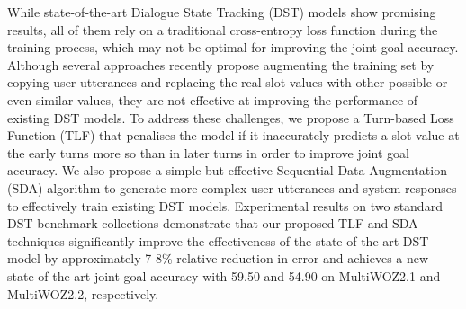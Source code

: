 While state-of-the-art Dialogue State Tracking (DST) models show promising results, all of them rely on a traditional cross-entropy loss function during the training process, which may not be optimal for improving the joint goal accuracy. Although several approaches recently propose augmenting the training set by copying user utterances and replacing the real slot values with other possible or even similar values, they are not effective at improving the performance of existing DST models. To address these challenges, we propose a Turn-based Loss Function (TLF) that penalises the model if it inaccurately predicts a slot value at the early turns more so than in later turns in order to improve joint goal accuracy. We also propose a simple but effective Sequential Data Augmentation (SDA) algorithm to generate more complex user utterances and system responses to effectively train existing DST models. Experimental results on two standard DST benchmark collections demonstrate that our proposed TLF and SDA techniques significantly improve the effectiveness of the state-of-the-art DST model by approximately 7-8\% relative reduction in error and achieves a new state-of-the-art joint goal accuracy with 59.50 and 54.90 on MultiWOZ2.1 and MultiWOZ2.2, respectively.

